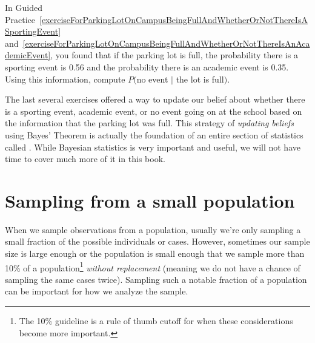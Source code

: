 \begin{exercisewrap}
\begin{nexercise} \label{exerciseForParkingLotOnCampusBeingFullAndWhetherOrNotThereIsNoEvent}
In Guided Practice~\ref{exerciseForParkingLotOnCampusBeingFullAndWhetherOrNotThereIsASportingEvent} and~\ref{exerciseForParkingLotOnCampusBeingFullAndWhetherOrNotThereIsAnAcademicEvent}, you found that if the parking lot is full, the probability there is a sporting event is 0.56 and the probability there is an academic event is 0.35. Using this information, compute $P($no event $|$ the lot is full$)$.\footnotemark
\end{nexercise}
\end{exercisewrap}

The last several exercises offered a way to update our belief about whether there is a sporting event, academic event, or no event going on at the school based on the information that the parking lot was full. This strategy of \emph{updating beliefs} using Bayes' Theorem is actually the foundation of an entire section of statistics called . While Bayesian statistics is very important and useful, we will not have time to cover much more of it in this book.



{}





\section{Sampling from a small population}
\label{smallPop}

\noindent%
When we sample observations from a population,
usually we're only sampling a small fraction of
the possible individuals or cases.
However, sometimes our sample size is large enough
or the population is small enough that we
sample more than 10\% of a population\footnote{The 10\%
  guideline is a rule of thumb cutoff for when these
  considerations become more important.}
\emph{without
replacement} (meaning we do not have a chance of
sampling the same cases twice).
Sampling such a notable fraction of a population
can be important for how we analyze the
sample.

